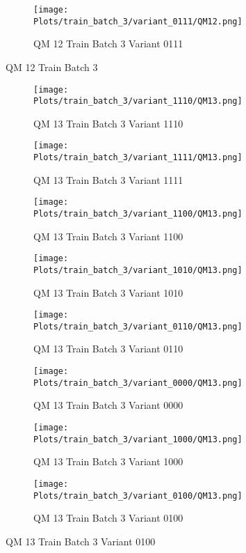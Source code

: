 \documentclass{DissertateFigs}
\begin{document}
\begin{figure}[t!]
\medskip

    \begin{subfigure}{0.47\textwidth}
    \texttt{[image: Plots/train\_batch\_3/variant\_0111/QM12.png]}
    \caption{QM 12 Train Batch 3 Variant 0111}
    \end{subfigure}
\caption{QM 12 Train Batch 3}
    \end{figure}
\clearpage
\begin{figure}[t!]
    \begin{subfigure}{0.47\textwidth}
    \texttt{[image: Plots/train\_batch\_3/variant\_1110/QM13.png]}
    \caption{QM 13 Train Batch 3 Variant 1110}
    \end{subfigure}
    \begin{subfigure}{0.47\textwidth}
    \texttt{[image: Plots/train\_batch\_3/variant\_1111/QM13.png]}
    \caption{QM 13 Train Batch 3 Variant 1111}
    \end{subfigure}

\medskip

    \begin{subfigure}{0.47\textwidth}
    \texttt{[image: Plots/train\_batch\_3/variant\_1100/QM13.png]}
    \caption{QM 13 Train Batch 3 Variant 1100}
    \end{subfigure}
    \begin{subfigure}{0.47\textwidth}
    \texttt{[image: Plots/train\_batch\_3/variant\_1010/QM13.png]}
    \caption{QM 13 Train Batch 3 Variant 1010}
    \end{subfigure}

\medskip

    \begin{subfigure}{0.47\textwidth}
    \texttt{[image: Plots/train\_batch\_3/variant\_0110/QM13.png]}
    \caption{QM 13 Train Batch 3 Variant 0110}
    \end{subfigure}
    \begin{subfigure}{0.47\textwidth}
    \texttt{[image: Plots/train\_batch\_3/variant\_0000/QM13.png]}
    \caption{QM 13 Train Batch 3 Variant 0000}
    \end{subfigure}

\medskip

    \begin{subfigure}{0.47\textwidth}
    \texttt{[image: Plots/train\_batch\_3/variant\_1000/QM13.png]}
    \caption{QM 13 Train Batch 3 Variant 1000}
    \end{subfigure}
    \begin{subfigure}{0.47\textwidth}
    \texttt{[image: Plots/train\_batch\_3/variant\_0100/QM13.png]}
    \caption{QM 13 Train Batch 3 Variant 0100}
    \end{subfigure}


\end{figure}
\end{document}
